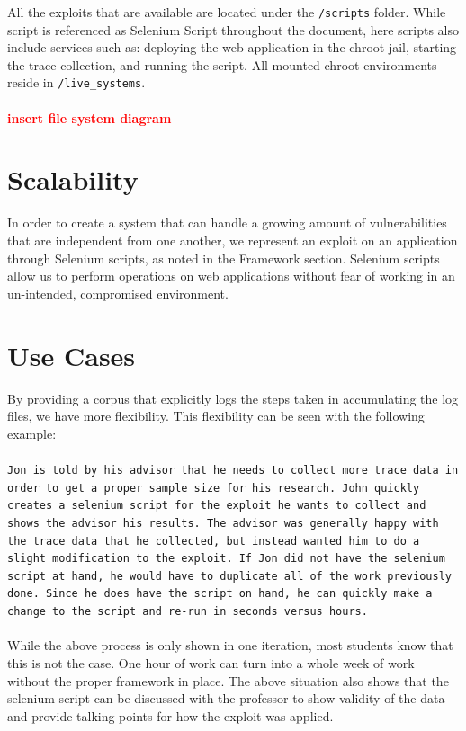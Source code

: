 \documentclass[letterpaper,twocolumn,10pt]{article}
\begin{document}
All the exploits that are available are located under the {\tt /scripts} folder.  While script is referenced as Selenium Script throughout the document, here scripts also include services such as: deploying the web application in the chroot jail, starting the trace collection, and running the script. All mounted chroot environments reside in {\tt /live\_systems}. 
\\\\
\textcolor{red}{
{\bf insert file system diagram}
}


\section{Scalability}
In order to create a system that can handle a growing amount of vulnerabilities that are independent from one another, we represent an exploit on an application through  Selenium scripts, as noted in the Framework section.  Selenium scripts allow us to perform operations on web applications without fear of working in an un-intended, compromised environment. 

\section{Use Cases}
By providing a corpus that explicitly logs the steps taken in accumulating the log files, we have more flexibility.  This flexibility can be seen with the following example:  
\\\\
{\tt Jon is told by his advisor that he needs to collect more trace data in order to get a proper sample size for his research.  John quickly creates a selenium script for the exploit he wants to collect and shows the advisor his results.  The advisor was generally happy with the trace data that he collected, but instead wanted him to do a slight modification to the exploit.  If Jon did not have the selenium script at hand, he would have to duplicate all of the work previously done.  Since he does have the script on hand, he can quickly make a change to the script and re-run in seconds versus hours.}
\\\\
While the above process is only shown in one iteration, most students know that this is not the case.  One hour of work can turn into a whole week of work without the proper framework in place.  The above situation also shows that the selenium script can be discussed with the professor to show validity of the data and provide talking points for how the exploit was applied.
\end{document}
